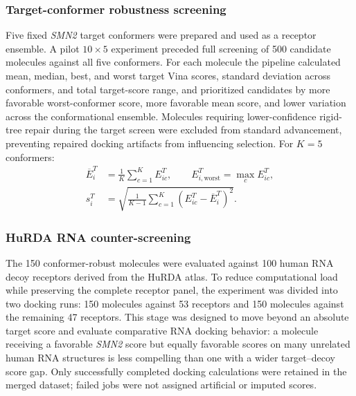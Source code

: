 \documentclass[journal]{IEEEtran}
\begin{document}
\subsubsection{Target-conformer robustness screening}
Five fixed \textit{SMN2} target conformers were prepared and used as a
receptor ensemble. A pilot $10 \times 5$ experiment preceded full
screening of 500 candidate molecules against all five conformers. For
each molecule the pipeline calculated mean, median, best, and worst
target Vina scores, standard deviation across conformers, and total
target-score range, and prioritized candidates by more favorable
worst-conformer score, more favorable mean score, and lower variation
across the conformational ensemble. Molecules requiring lower-confidence
rigid-tree repair during the target screen were excluded from standard
advancement, preventing repaired docking artifacts from influencing
selection. For $K = 5$ conformers:
\begin{equation}
\begin{aligned}
\overline{E}_{i}^{T} &= \frac{1}{K}\sum_{c=1}^{K} E_{ic}^{T},
\qquad
E_{i,\mathrm{worst}}^{T} = \max_{c} E_{ic}^{T},\\[4pt]
s_{i}^{T} &= \sqrt{\frac{1}{K - 1}
\sum_{c=1}^{K}\left(E_{ic}^{T} - \overline{E}_{i}^{T}\right)^{2}}.
\end{aligned}
\label{eq:conformer}
\end{equation}

\subsubsection{HuRDA RNA counter-screening}
The 150 conformer-robust molecules were evaluated against 100 human RNA
decoy receptors derived from the HuRDA atlas. To reduce computational
load while preserving the complete receptor panel, the experiment was
divided into two docking runs: 150 molecules against 53 receptors and
150 molecules against the remaining 47 receptors. This stage was
designed to move beyond an absolute target score and evaluate
comparative RNA docking behavior: a molecule receiving a favorable
\textit{SMN2} score but equally favorable scores on many unrelated human
RNA structures is less compelling than one with a wider target--decoy
score gap. Only successfully completed docking
calculations were retained in the merged dataset; failed jobs were not
assigned artificial or imputed scores.
\end{document}
